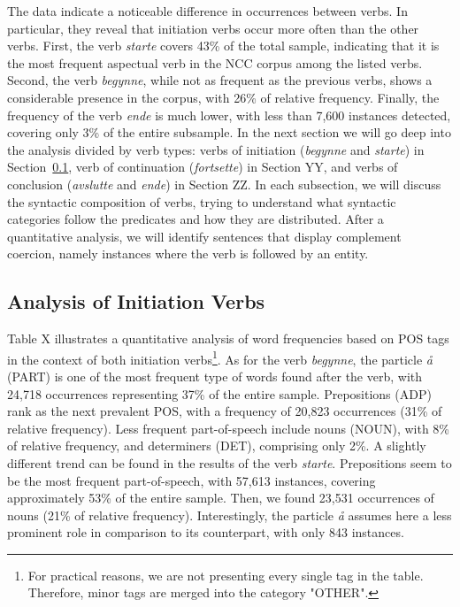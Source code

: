 \documentclass{article}
\begin{document}
\noindent The data indicate a noticeable difference in occurrences between verbs. In particular, they reveal that initiation verbs occur more often than the other verbs. First, the verb \emph{starte} covers 43\% of the total sample, indicating that it is the most frequent aspectual verb in the NCC corpus among the listed verbs. Second, the verb \emph{begynne}, while not as frequent as the previous verbs, shows a considerable presence in the corpus, with 26\% of relative frequency. Finally, the frequency of the verb \emph{ende} is much lower, with less than 7,600 instances detected, covering only 3\% of the entire subsample. 
In the next section we will go deep into the analysis divided by verb types: verbs of initiation (\emph{begynne} and \emph{starte}) in Section~\ref{sec:initiation_verbs}, verb of continuation (\emph{fortsette}) in Section YY, and verbs of conclusion (\emph{avslutte} and \emph{ende}) in Section ZZ.
In each subsection, we will discuss the syntactic composition of verbs, trying to understand what syntactic categories follow the predicates and how they are distributed. After a quantitative analysis, we will identify sentences that display complement coercion, namely instances where the verb is followed by an entity. 

\subsection{Analysis of Initiation Verbs}
\label{sec:initiation_verbs}
Table X illustrates a quantitative analysis of word frequencies based on POS tags in the context of both initiation verbs\footnote{For practical reasons, we are not presenting every single tag in the table. Therefore, minor tags are merged into the category "OTHER".}. As for the verb \emph{begynne}, the particle \emph{å} (PART) is one of the most frequent type of words found after the verb, with 24,718 occurrences representing 37\% of the entire sample. Prepositions (ADP) rank as the next prevalent POS, with a frequency of 20,823 occurrences (31\% of relative frequency). Less frequent part-of-speech include nouns (NOUN), with 8\% of relative frequency, and determiners (DET), comprising only 2\%. 
A slightly different trend can be found in the results of the verb \emph{starte}. Prepositions seem to be the most frequent part-of-speech, with 57,613 instances, covering approximately 53\% of the entire sample. Then, we found 23,531 occurrences of nouns (21\% of relative frequency). Interestingly, the particle \emph{å} assumes here a less prominent role in comparison to its counterpart, with only 843 instances.
\end{document}
